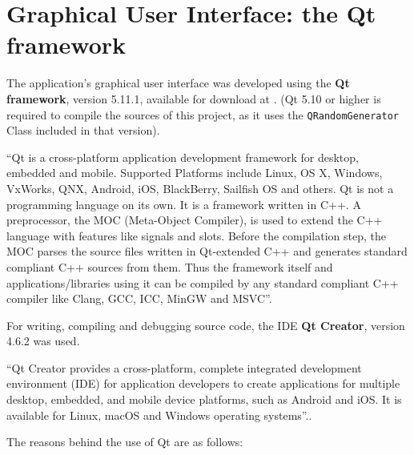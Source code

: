 \section{Graphical User Interface: the Qt framework}
The application's graphical user interface was developed using the \textbf{Qt framework}, version 5.11.1, available for download at \cite{qtdown}. (Qt 5.10 or higher is required to compile the sources of this project, as it uses the \texttt{QRandomGenerator} Class included in that version).

``Qt is a cross-platform application development framework for desktop, embedded and mobile. Supported Platforms include Linux, OS X, Windows, VxWorks, QNX, Android, iOS, BlackBerry, Sailfish OS and others. Qt is not a programming language on its own. It is a framework written in C++. A preprocessor, the MOC (Meta-Object Compiler), is used to extend the C++ language with features like signals and slots. Before the compilation step, the MOC parses the source files written in Qt-extended C++ and generates standard compliant C++ sources from them. Thus the framework itself and applications/libraries using it can be compiled by any standard compliant C++ compiler like Clang, GCC, ICC, MinGW and MSVC''.\cite{Qt}  


For writing, compiling and debugging source code, the IDE \textbf{Qt Creator}, version 4.6.2 was used.

``Qt Creator provides a cross-platform, complete integrated development environment (IDE) for application developers to create applications for multiple desktop, embedded, and mobile device platforms, such as Android and iOS. It is available for Linux, macOS and Windows operating systems''.\cite{QtC}.

\vspace{5pt}
The reasons behind the use of Qt are as follows:

